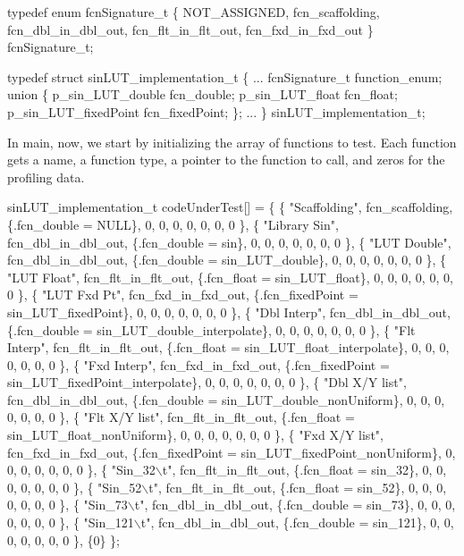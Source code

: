 \begin{DoxyCode}
typedef enum fcnSignature\_t
\{
    NOT\_ASSIGNED,
    fcn\_scaffolding,
    fcn\_dbl\_in\_dbl\_out,
    fcn\_flt\_in\_flt\_out,
    fcn\_fxd\_in\_fxd\_out
\} fcnSignature\_t;

typedef struct sinLUT\_implementation\_t
\{
    ...
    fcnSignature\_t function\_enum;
    union
    \{
        p\_sin\_LUT\_double fcn\_double;
        p\_sin\_LUT\_float fcn\_float;
        p\_sin\_LUT\_fixedPoint fcn\_fixedPoint;
    \};
    ...
\} sinLUT\_implementation\_t;
\end{DoxyCode}
 In {\ttfamily main}, now, we start by initializing the array of functions to test. Each function gets a name, a function type, a pointer to the function to call, and zeros for the profiling data. 
\begin{DoxyCode}
sinLUT\_implementation\_t codeUnderTest[] = 
\{
    \{ "Scaffolding",    fcn\_scaffolding,    \{.fcn\_double = NULL\},                               0, 0, 0, 0,
       0, 0, 0 \},
    \{ "Library Sin",    fcn\_dbl\_in\_dbl\_out, \{.fcn\_double = sin\},                                0, 0, 0, 0,
       0, 0, 0 \},
    \{ "LUT Double",     fcn\_dbl\_in\_dbl\_out, \{.fcn\_double = sin\_LUT\_double\},                     0, 0, 0, 0,
       0, 0, 0 \},
    \{ "LUT Float",      fcn\_flt\_in\_flt\_out, \{.fcn\_float = sin\_LUT\_float\},                       0, 0, 0, 0,
       0, 0, 0 \},
    \{ "LUT Fxd Pt",     fcn\_fxd\_in\_fxd\_out, \{.fcn\_fixedPoint = sin\_LUT\_fixedPoint\},             0, 0, 0, 0,
       0, 0, 0 \},
    \{ "Dbl Interp",     fcn\_dbl\_in\_dbl\_out, \{.fcn\_double = sin\_LUT\_double\_interpolate\},         0, 0, 0, 0,
       0, 0, 0 \},
    \{ "Flt Interp",     fcn\_flt\_in\_flt\_out, \{.fcn\_float = sin\_LUT\_float\_interpolate\},           0, 0, 0, 0,
       0, 0, 0 \},
    \{ "Fxd Interp",     fcn\_fxd\_in\_fxd\_out, \{.fcn\_fixedPoint = sin\_LUT\_fixedPoint\_interpolate\}, 0, 0, 0, 0,
       0, 0, 0 \},
    \{ "Dbl X/Y list",   fcn\_dbl\_in\_dbl\_out, \{.fcn\_double = sin\_LUT\_double\_nonUniform\},          0, 0, 0, 0,
       0, 0, 0 \},
    \{ "Flt X/Y list",   fcn\_flt\_in\_flt\_out, \{.fcn\_float = sin\_LUT\_float\_nonUniform\},            0, 0, 0, 0,
       0, 0, 0 \},
    \{ "Fxd X/Y list",   fcn\_fxd\_in\_fxd\_out, \{.fcn\_fixedPoint = sin\_LUT\_fixedPoint\_nonUniform\},  0, 0, 0, 0,
       0, 0, 0 \},
    \{ "Sin\_32\(\backslash\)t",       fcn\_flt\_in\_flt\_out, \{.fcn\_float = sin\_32\},                              0, 0, 0, 0,
       0, 0, 0 \},
    \{ "Sin\_52\(\backslash\)t",       fcn\_flt\_in\_flt\_out, \{.fcn\_float = sin\_52\},                              0, 0, 0, 0,
       0, 0, 0 \},
    \{ "Sin\_73\(\backslash\)t",       fcn\_dbl\_in\_dbl\_out, \{.fcn\_double = sin\_73\},                             0, 0, 0, 0,
       0, 0, 0 \},
    \{ "Sin\_121\(\backslash\)t",      fcn\_dbl\_in\_dbl\_out, \{.fcn\_double = sin\_121\},                            0, 0, 0, 0,
       0, 0, 0 \},
    \{0\}
\};
\end{DoxyCode}
